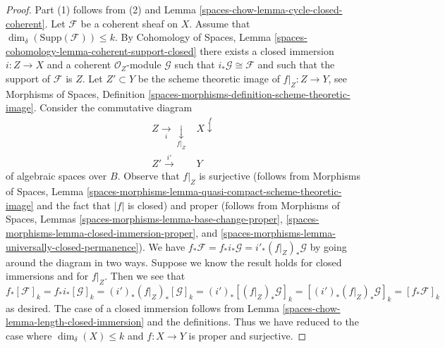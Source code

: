 \begin{proof}
Part (1) follows from (2) and Lemma \ref{spaces-chow-lemma-cycle-closed-coherent}.
Let $\mathcal{F}$ be a coherent sheaf on $X$.
Assume that $\dim_\delta(\text{Supp}(\mathcal{F})) \leq k$.
By Cohomology of Spaces, Lemma
\ref{spaces-cohomology-lemma-coherent-support-closed}
there exists a closed immersion $i : Z \to X$ and a coherent
$\mathcal{O}_Z$-module $\mathcal{G}$ such that
$i_*\mathcal{G} \cong \mathcal{F}$ and such that the support
of $\mathcal{F}$ is $Z$. Let $Z' \subset Y$ be the scheme theoretic image
of $f|_Z : Z \to Y$, see Morphisms of Spaces, Definition
\ref{spaces-morphisms-definition-scheme-theoretic-image}.
Consider the commutative diagram
$$
\begin{array}{cc}Z \underset{i}{\longrightarrow}\underset{f|_Z}{\downarrow} & X \overset{f}{\downarrow} \\ Z' \overset{i'}{\longrightarrow} & Y\end{array}
$$
of algebraic spaces over $B$. Observe that $f|_Z$ is surjective
(follows from Morphisms of Spaces, Lemma
\ref{spaces-morphisms-lemma-quasi-compact-scheme-theoretic-image}
and the fact that $|f|$ is closed) and proper
(follows from Morphisms of Spaces, Lemmas
\ref{spaces-morphisms-lemma-base-change-proper},
\ref{spaces-morphisms-lemma-closed-immersion-proper}, and
\ref{spaces-morphisms-lemma-universally-closed-permanence}).
We have $f_*\mathcal{F} = f_*i_*\mathcal{G} = i'_*(f|_Z)_*\mathcal{G}$
by going around the diagram in two ways. Suppose we know the result holds
for closed immersions and for $f|_Z$. Then we see that
$$
f_*[\mathcal{F}]_k = f_*i_*[\mathcal{G}]_k
= (i')_*(f|_Z)_*[\mathcal{G}]_k =
(i')_*[(f|_Z)_*\mathcal{G}]_k =
[(i')_*(f|_Z)_*\mathcal{G}]_k = [f_*\mathcal{F}]_k
$$
as desired. The case of a closed immersion follows from
Lemma \ref{spaces-chow-lemma-length-closed-immersion} and the definitions.
Thus we have reduced to the case where
$\dim_\delta(X) \leq k$ and $f : X \to Y$ is proper and surjective.


\end{proof}
